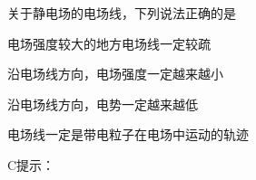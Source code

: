 关于静电场的电场线，下列说法正确的是\paren[]
\begin{choices}
	\item 电场强度较大的地方电场线一定较疏
	\item 沿电场线方向，电场强度一定越来越小
	\item 沿电场线方向，电势一定越来越低
	\item 电场线一定是带电粒子在电场中运动的轨迹
\end{choices}
\begin{answer}
	C\qquad 提示：
\end{answer}
